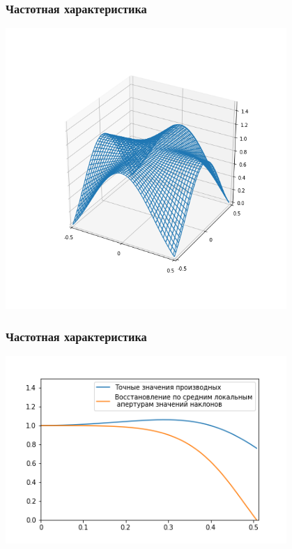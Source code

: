 \documentclass[11pt]{beamer}
\begin{document}
\begin{frame}
\frametitle{Частотная характеристика}
\includegraphics[width=0.8\textwidth]{3dpiece.png}
\end{frame}

\begin{frame}
\frametitle{Частотная характеристика}
\includegraphics[width=0.8\textwidth]{2cases.png}
\end{frame}
\end{document}
